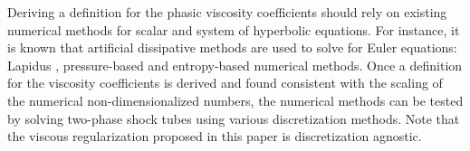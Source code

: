 \documentclass[preprint,10pt]{elsarticle}
\begin{document}
{Deriving a definition for the phasic viscosity coefficients should rely on existing numerical methods for scalar and system of hyperbolic equations. For instance, it is known that artificial dissipative methods are used to solve for Euler equations: Lapidus \cite{Lapidus_paper, Lapidus_book}, pressure-based \cite{PBV_book} and entropy-based \cite{jlg1, valentin} numerical methods. Once a definition for the viscosity coefficients is derived and found consistent with the scaling of the numerical non-dimensionalized numbers, the numerical methods can be tested by solving two-phase shock tubes using various discretization methods. Note that the viscous regularization proposed in this paper is discretization agnostic. 

\clearpage
\begin{appendices}

\end{appendices}}
\end{document}
